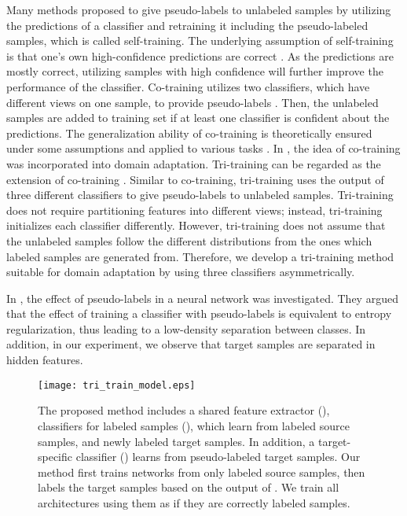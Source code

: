 \documentclass{article}
\begin{document}
Many methods proposed to give pseudo-labels to unlabeled samples by utilizing the predictions of a classifier and retraining it including the pseudo-labeled samples, which is called self-training. The underlying assumption of self-training is that one's own high-confidence predictions are correct \cite{zhu2005semi}. As the predictions are mostly correct, utilizing samples with high confidence will further improve the performance of the classifier. Co-training utilizes two classifiers, which have different views on one sample, to provide pseudo-labels \cite{blum1998combining,tanha2011ensemble}. Then, the unlabeled samples are added to training set if at least one classifier is confident about the predictions. The generalization ability of co-training is theoretically ensured \cite{balcan2004co,dasgupta2001pac} under some assumptions and applied to various tasks \cite{wan2009co,levin2003unsupervised}. In \cite{coda}, the idea of co-training was incorporated into domain adaptation. Tri-training can be regarded as the extension of co-training \cite{zhou2005tri}. Similar to co-training, tri-training uses the output of three different classifiers to give pseudo-labels to unlabeled samples. Tri-training does not require partitioning features into different views; instead, tri-training initializes each classifier differently. However, tri-training does not assume that the unlabeled samples follow the different distributions from the ones which labeled samples are generated from. Therefore, we develop a tri-training method suitable for domain adaptation by using three classifiers asymmetrically. 

In \cite{lee2013pseudo}, the effect of pseudo-labels in a neural network was investigated. They argued that the effect of training a classifier with pseudo-labels is equivalent to entropy regularization, thus leading to a low-density separation between classes. In addition, in our experiment, we observe that target samples are separated in hidden features.

\begin{figure}[t]
  \begin{center}
   \texttt{[image: tri\_train\_model.eps]}
  \end{center}
  \caption{The proposed method includes a shared feature extractor (), classifiers for labeled samples (), which learn from labeled source samples, and newly labeled target samples. In addition, a target-specific classifier () learns from pseudo-labeled target samples. Our method first trains networks from only labeled source samples, then labels the target samples based on the output of . We train all architectures using them as if they are correctly labeled samples.}
  \label{fig:propose}
  \vspace{-2mm}
\end{figure}
\vspace{-3mm}
\end{document}
